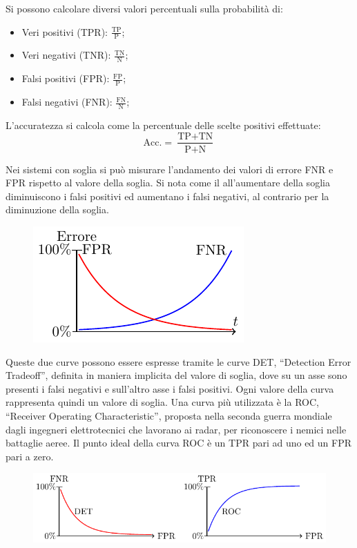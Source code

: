 \documentclass{article}
\numberwithin{equation}{subsection}
\begin{document}
Si possono calcolare diversi valori percentuali sulla probabilità di:
\begin{itemize}
    \item Veri positivi (TPR): $\displaystyle\frac{\text{TP}}{\text{P}}$;
    \item Veri negativi (TNR): $\displaystyle\frac{\text{TN}}{\text{N}}$;
    \item Falsi positivi (FPR): $\displaystyle\frac{\text{FP}}{\text{P}}$;
    \item Falsi negativi (FNR): $\displaystyle\frac{\text{FN}}{\text{N}}$;
\end{itemize}

L'accuratezza si calcola come la percentuale delle scelte positivi effettuate:
\begin{equation}
    \text{Acc.}=\displaystyle\frac{\text{TP}+\text{TN}}{\text{P}+\text{N}}
\end{equation}

Nei sistemi con soglia si può misurare l'andamento dei valori di errore FNR e FPR rispetto 
al valore della soglia. Si nota come il all'aumentare della soglia diminuiscono i falsi 
positivi ed aumentano i falsi negativi, al contrario per la diminuzione della soglia. 

\begin{figure}[H]%
    \centering%
    \includegraphics{valore_soglia.pdf}%
\end{figure}

Queste due curve possono essere espresse tramite le curve DET, ``Detection Error Tradeoff'', 
definita in maniera implicita del valore di soglia, dove su un asse sono presenti i falsi negativi e sull'altro asse i falsi positivi. Ogni valore della curva rappresenta quindi un 
valore di soglia. Una curva più utilizzata è la ROC, ``Receiver Operating Characteristic'', proposta nella seconda guerra mondiale dagli ingegneri elettrotecnici che lavorano ai radar, per riconoscere i nemici nelle battaglie aeree. Il punto ideal della curva ROC è un 
TPR pari ad uno ed un FPR pari a zero. 

\begin{figure}[H]%
    \centering%
    \includegraphics{det_roc.pdf}%
\end{figure}
\end{document}
